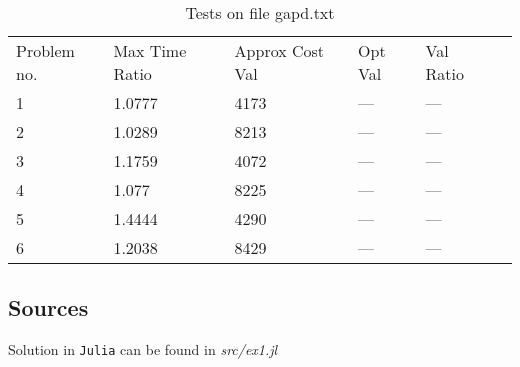     \begin{table}[]
    \caption{Tests on file gapd.txt}
    \centering
    \begin{tabular}{llllll}
    Problem no. & Max Time Ratio & Approx Cost Val  & Opt Val & Val Ratio \\ 1 & 1.0777 & 4173 & --- & ---\\ \hline
2 & 1.0289 & 8213 & --- & ---\\ \hline
3 & 1.1759 & 4072 & --- & ---\\ \hline
4 & 1.077 & 8225 & --- & ---\\ \hline
5 & 1.4444 & 4290 & --- & ---\\ \hline
6 & 1.2038 & 8429 & --- & ---\\ \hline
\end{tabular}
    \end{table}
    

\subsection{Sources}
Solution in \texttt{Julia} can be found in  \textit{src/ex1.jl}

